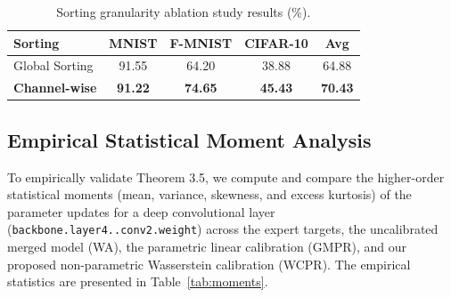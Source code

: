 \documentclass{article}
\theoremstyle{plain}
\theoremstyle{definition}
\theoremstyle{remark}
\begin{document}
\begin{table}[h]
  \caption{Sorting granularity ablation study results (\%).}
  \label{tab:ablation}
  \vskip 0.15in
  \begin{center}
    \begin{small}
      \begin{sc}
        \setlength{\tabcolsep}{4pt}
        \begin{tabular}{lcccc}
          \toprule
          Sorting & MNIST & F-MNIST & CIFAR-10 & Avg \\
          \midrule
          Global Sorting & 91.55 & 64.20 & 38.88 & 64.88 \\
          \textbf{Channel-wise} & \textbf{91.22} & \textbf{74.65} & \textbf{45.43} & \textbf{70.43} \\
          \bottomrule
        \end{tabular}
      \end{sc}
    \end{small}
  \end{center}
  \vskip -0.1in
\end{table}

\subsection{Empirical Statistical Moment Analysis}
To empirically validate Theorem 3.5, we compute and compare the higher-order statistical moments (mean, variance, skewness, and excess kurtosis) of the parameter updates for a deep convolutional layer (\texttt{backbone.\allowbreak layer4..\allowbreak conv2.\allowbreak weight}) across the expert targets, the uncalibrated merged model (WA), the parametric linear calibration (GMPR), and our proposed non-parametric Wasserstein calibration (WCPR). The empirical statistics are presented in Table~\ref{tab:moments}.
\end{document}
